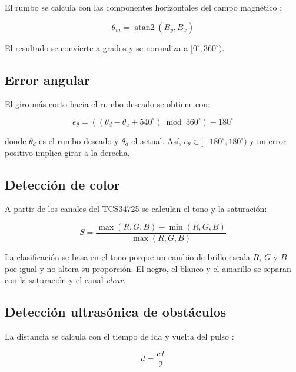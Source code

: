 \documentclass[journal]{IEEEtran}
\begin{document}
El rumbo se calcula con las componentes horizontales del campo magnético \cite{QMC5883L}:

\begin{equation}
\theta_m = \operatorname{atan2}(B_y,B_x)
\label{eq:rumbo}
\end{equation}

El resultado se convierte a grados y se normaliza a $[0^\circ,360^\circ)$.

\subsection{Error angular}

El giro más corto hacia el rumbo deseado se obtiene con:

\begin{equation}
e_\theta =
\left((\theta_d-\theta_a+540^\circ)
\bmod 360^\circ\right)-180^\circ
\label{eq:error_angular}
\end{equation}

donde $\theta_d$ es el rumbo deseado y $\theta_a$ el actual. Así, $e_\theta\in[-180^\circ,180^\circ)$ y un error positivo implica girar a la derecha.

\subsection{Detección de color}

A partir de los canales del TCS34725 \cite{TCS34725} se calculan el tono y la saturación:

\begin{equation}
S=\frac{\max(R,G,B)-\min(R,G,B)}{\max(R,G,B)}
\label{eq:saturacion}
\end{equation}

La clasificación se basa en el tono porque un cambio de brillo escala $R$, $G$ y $B$ por igual y no altera su proporción. El negro, el blanco y el amarillo se separan con la saturación y el canal \textit{clear}.

\subsection{Detección ultrasónica de obstáculos}

La distancia se calcula con el tiempo de ida y vuelta del pulso \cite{HCSR04}:

\begin{equation}
d=\frac{c\,t}{2}
\label{eq:distancia_ultrasonica}
\end{equation}
\end{document}
